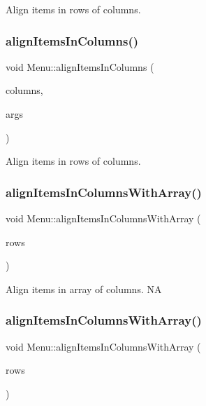 Align items in rows of columns. \mbox{\label{classMenu_a2a568b7bfe853e3c73acba7e3622d220}} 
\subsubsection{\texorpdfstring{align\+Items\+In\+Columns()}{alignItemsInColumns()}\hspace{0.1cm}{\footnotesize\ttfamily [4/4]}}
{\footnotesize\ttfamily void Menu\+::align\+Items\+In\+Columns (\begin{DoxyParamCaption}\item[{int}]{columns,  }\item[{va\+\_\+list}]{args }\end{DoxyParamCaption})}

Align items in rows of columns. \mbox{\label{classMenu_a68484c458c9e99064204078a6ad2e2e8}} 
\subsubsection{\texorpdfstring{align\+Items\+In\+Columns\+With\+Array()}{alignItemsInColumnsWithArray()}\hspace{0.1cm}{\footnotesize\ttfamily [1/2]}}
{\footnotesize\ttfamily void Menu\+::align\+Items\+In\+Columns\+With\+Array (\begin{DoxyParamCaption}\item[{const Value\+Vector \&}]{rows }\end{DoxyParamCaption})}

Align items in array of columns.  NA \mbox{\label{classMenu_a68484c458c9e99064204078a6ad2e2e8}} 
\subsubsection{\texorpdfstring{align\+Items\+In\+Columns\+With\+Array()}{alignItemsInColumnsWithArray()}\hspace{0.1cm}{\footnotesize\ttfamily [2/2]}}
{\footnotesize\ttfamily void Menu\+::align\+Items\+In\+Columns\+With\+Array (\begin{DoxyParamCaption}\item[{const Value\+Vector \&}]{rows }\end{DoxyParamCaption})}

